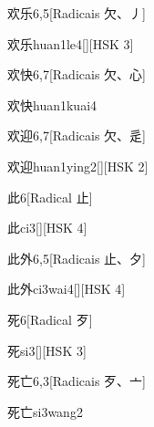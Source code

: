 \begin{entry}{欢乐}{6,5}[Radicais ⽋、⼃]
  \begin{phonetics}{欢乐}{huan1le4}[][HSK 3]
  \end{phonetics}
\end{entry}

\begin{entry}{欢快}{6,7}[Radicais ⽋、⼼]
  \begin{phonetics}{欢快}{huan1kuai4}
  \end{phonetics}
\end{entry}

\begin{entry}{欢迎}{6,7}[Radicais ⽋、⾡]
  \begin{phonetics}{欢迎}{huan1ying2}[][HSK 2]
  \end{phonetics}
\end{entry}

\begin{entry}{此}{6}[Radical ⽌]
  \begin{phonetics}{此}{ci3}[][HSK 4]
  \end{phonetics}
\end{entry}

\begin{entry}{此外}{6,5}[Radicais ⽌、⼣]
  \begin{phonetics}{此外}{ci3wai4}[][HSK 4]
  \end{phonetics}
\end{entry}

\begin{entry}{死}{6}[Radical ⽍]
  \begin{phonetics}{死}{si3}[][HSK 3]
  \end{phonetics}
\end{entry}

\begin{entry}{死亡}{6,3}[Radicais ⽍、⼇]
  \begin{phonetics}{死亡}{si3wang2}
  \end{phonetics}
\end{entry}

